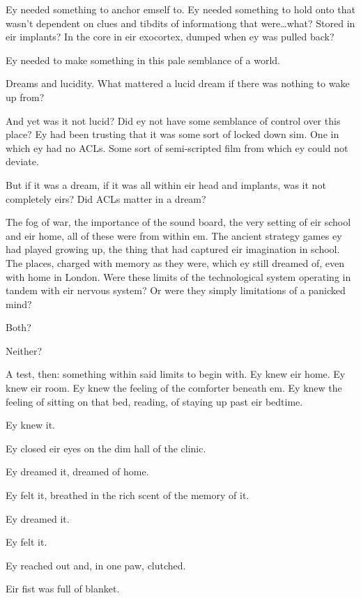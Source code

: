 Ey needed something to anchor emself to. Ey needed something to hold onto that wasn't dependent on clues and tibdits of informationg that were\ldots{}what? Stored in eir implants? In the core in eir exocortex, dumped when ey was pulled back?

Ey needed to make something in this pale semblance of a world.

Dreams and lucidity. What mattered a lucid dream if there was nothing to wake up from?

And yet was it not lucid? Did ey not have some semblance of control over this place? Ey had been trusting that it was some sort of locked down sim. One in which ey had no ACLs. Some sort of semi-scripted film from which ey could not deviate.

But if it was a dream, if it was all within eir head and implants, was it not completely eirs? Did ACLs matter in a dream?

The fog of war, the importance of the sound board, the very setting of eir school and eir home, all of these were from within em. The ancient strategy games ey had played growing up, the thing that had captured eir imagination in school. The places, charged with memory as they were, which ey still dreamed of, even with home in London. Were these limits of the technological system operating in tandem with eir nervous system? Or were they simply limitations of a panicked mind?

Both?

Neither?

A test, then: something within said limits to begin with. Ey knew eir home. Ey knew eir room. Ey knew the feeling of the comforter beneath em. Ey knew the feeling of sitting on that bed, reading, of staying up past eir bedtime.

Ey knew it.

Ey closed eir eyes on the dim hall of the clinic.

Ey dreamed it, dreamed of home.

Ey felt it, breathed in the rich scent of the memory of it.

Ey dreamed it.

Ey felt it.

Ey reached out and, in one paw, clutched.

Eir fist was full of blanket.

